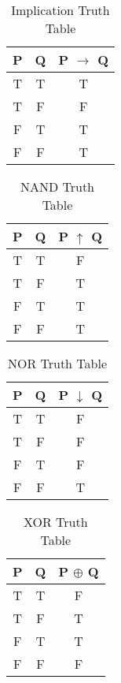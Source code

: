 \begin{multicols}{2}
\begin{table}[H]
\centering
\caption{Implication Truth Table}
\begin{tabular}[t]{|c|c|c|}
\hline
\textbf{P} & \textbf{Q} & \textbf{P $\to$ Q} \\ \hline
T & T & T \\ \hline
T & F & F \\ \hline
F & T & T \\ \hline
F & F & T \\ \hline
\end{tabular}
\end{table}

\begin{table}[H]
\centering
\caption{NAND Truth Table}
\begin{tabular}[t]{|c|c|c|}
\hline
\textbf{P} & \textbf{Q} & \textbf{P $\uparrow$ Q} \\ \hline
T & T & F \\ \hline
T & F & T \\ \hline
F & T & T \\ \hline
F & F & T \\ \hline
\end{tabular}
\end{table}

\begin{table}[H]
\centering
\caption{NOR Truth Table}
\begin{tabular}[t]{|c|c|c|}
\hline
\textbf{P} & \textbf{Q} & \textbf{P $\downarrow$ Q} \\ \hline
T & T & F \\ \hline
T & F & F \\ \hline
F & T & F \\ \hline
F & F & T \\ \hline
\end{tabular}
\end{table}

\begin{table}[H]
\centering
\caption{XOR Truth Table}
\begin{tabular}[t]{|c|c|c|}
\hline
\textbf{P} & \textbf{Q} & \textbf{P $\oplus$ Q} \\ \hline
T & T & F \\ \hline
T & F & T \\ \hline
F & T & T \\ \hline
F & F & F \\ \hline
\end{tabular}
\end{table}

\end{multicols}
